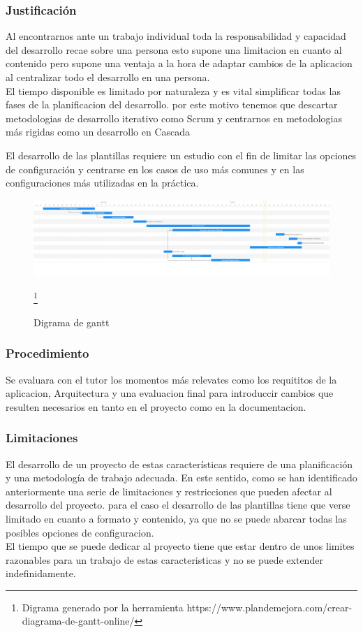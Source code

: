 \documentclass[12pt, a4paper, twoside]{article}
\begin{document}
\subsubsection{Justificación}
Al encontrarnos ante un trabajo individual toda la responsabilidad y capacidad del desarrollo recae sobre una persona esto supone una limitacion en cuanto al contenido pero supone una ventaja 
a la hora de adaptar cambios de la aplicacion al centralizar todo el desarrollo en una persona. \\ 
El tiempo disponible es limitado por naturaleza y es vital simplificar todas las fases de la planificacion del desarrollo. por este motivo tenemos que 
descartar metodologias de desarrollo iterativo como Scrum y centrarnos en metodologias más rigidas como un desarrollo en Cascada

El desarrollo de las plantillas requiere un estudio con el fin de limitar las opciones de configuración y centrarse en los casos de uso más comunes y en las configuraciones más utilizadas en la práctica.

\begin{figure}[ht]
	\centering
		\includegraphics[width=1\textwidth]{gantt.png}
	\caption{Digrama de gantt} \footnote{Digrama generado por la herramienta https://www.plandemejora.com/crear-diagrama-de-gantt-online/}
\end{figure}
\subsubsection{Procedimiento}
Se evaluara con el tutor los momentos más relevates como los requititos de la aplicacion, Arquitectura y una evaluacion final para introduccir cambios que resulten necesarios en tanto en el proyecto como 
en la documentacion.

\subsubsection{Limitaciones}
El desarrollo de un proyecto de estas características requiere de una planificación y una metodología de trabajo adecuada.
En este sentido, como se han identificado anteriormente una serie de limitaciones y restricciones que pueden afectar al desarrollo del proyecto.
para el caso el desarrollo de las plantillas tiene que verse limitado en cuanto a formato y contenido, ya que no se puede abarcar todas las posibles opciones de configuracion.
\\El tiempo que se puede dedicar al proyecto tiene que estar dentro de unos limites razonables para un trabajo de estas caracteristicas y no se puede extender indefinidamente.
\end{document}
